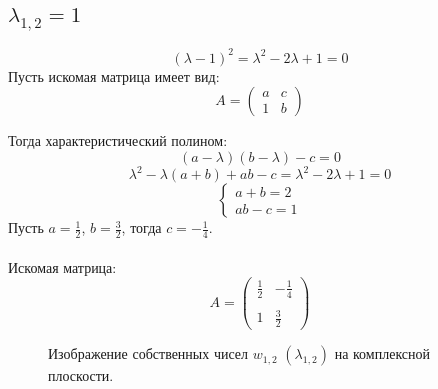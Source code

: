 \documentclass[a5paper, 10pt]{article}
\theoremstyle{definition}
\theoremstyle{plain}
\theoremstyle{remark}
\begin{document}
\newpage
\subsection{$\lambda_{1, 2} = 1$}

\begin{equation}
\left( \lambda - 1  \right)^2 = \lambda^2 - 2\lambda + 1 = 0
\end{equation}
Пусть искомая матрица имеет вид:
\begin{equation}
A =
\begin{pmatrix}
a & c \\
1 & b
\end{pmatrix}
\end{equation}

Тогда характеристический полином:
\begin{equation}
\left( a - \lambda \right) \left( b - \lambda \right) - c = 0
\end{equation}
\begin{equation}
\lambda^ 2 - \lambda (a + b ) + ab - c = \lambda^2 - 2\lambda + 1 = 0
\end{equation}
\begin{equation}
\begin{cases}
a + b = 2\\
ab - c = 1
\end{cases}
\end{equation}
Пусть $a = \frac{1}{2}$, $b = \frac{3}{2}$, тогда $c = -\frac{1}{4}$. \\
\\
Искомая матрица:
\begin{equation}
A =
\begin{pmatrix}
 \frac{1}{2} &   -\frac{1}{4}\\
\\
1 & \frac{3}{2}
\end{pmatrix}
\end{equation}
\begin{figure}[h!]
\caption{Изображение собственных чисел $w_{1, 2} \, \, \left( \lambda_{1, 2} \right)$ на комплексной плоскости.}
\end{figure}
\end{document}
